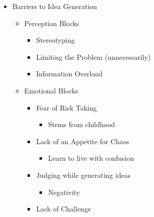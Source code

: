 \begin{itemize}

  \item Barriers to Idea Generation

    \begin{itemize}

      \item Perception Blocks

        \begin{itemize}

          \item Stereotyping

          \item Limiting the Problem (unnecessarily)

          \item Information Overload

        \end{itemize}

      \item Emotional Blocks

        \begin{itemize}

          \item Fear of Risk Taking

            \begin{itemize}

              \item Stems from childhood

            \end{itemize}

          \item Lack of an Appetite for Chaos

            \begin{itemize}

              \item Learn to live with confusion

            \end{itemize}

          \item Judging while generating ideas

            \begin{itemize}

              \item Negativity

            \end{itemize}

          \item Lack of Challenge


\end{itemize}
\end{itemize}
\end{itemize}
